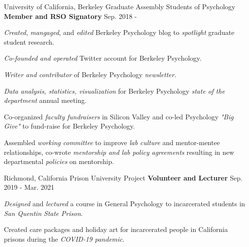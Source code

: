 

\begin{cventries}
    
  \cventry 
    {University of California, Berkeley} %
    {Graduate Assembly Students of Psychology}
    {\textbf{Member and RSO Signatory}} %
    {Sep. 2018 - } %
    {
      \begin{cvitems} %
        \item {\textit{Created}, \textit{mangaged}, and \textit{edited} Berkeley Psychology blog to \textit{spotlight} graduate student research.}
        \item {\textit{Co-founded and operated} Twitter account for Berkeley Psychology.}
        \item {\textit{Writer and contributor} of Berkeley Psychology \textit{newsletter}.}
        \item {\textit{Data analysis, statistics, visualization} for Berkeley Psychology \textit{state of the department} annual meeting.}
        \item {Co-organized \textit{faculty fundraisers} in Silicon Valley and co-led Psychology \textit{"Big Give"} to fund-raise for Berkeley Psychology.}
        \item {Assembled \textit{working committee} to improve \textit{lab culture} and mentor-mentee relationships, co-wrote \textit{mentorship and lab policy agreements} resulting in new departmental \textit{policies} on mentorship.}
      \end{cvitems}
    }
    
  \cventry
    {Richmond, California} %
    {Prison University Project}
    {\textbf{Volunteer and Lecturer}} %
    {Sep. 2019 - Mar. 2021} %
    {
      \begin{cvitems} %
        \item {\textit{Designed} and \textit{lectured} a course in General Psychology to incarcerated students in \textit{San Quentin State Prison}.}
        \item {Created care packages and holiday art for incarcerated people in California prisons during the \textit{COVID-19 pandemic}.}
      \end{cvitems}
    }
    

\end{cventries}
